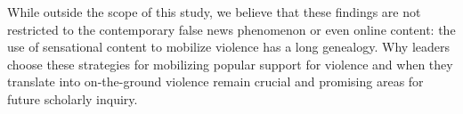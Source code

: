\documentclass[12pt, letterpaper]{article}
\begin{document}
While outside the scope of this study, we believe that these findings are not restricted to the contemporary false news phenomenon or even online content: the use of sensational content to mobilize violence has a long genealogy. Why leaders choose these strategies for mobilizing popular support for violence and when they translate into on-the-ground violence remain crucial and promising areas for future scholarly inquiry.

\newpage



\end{document}
